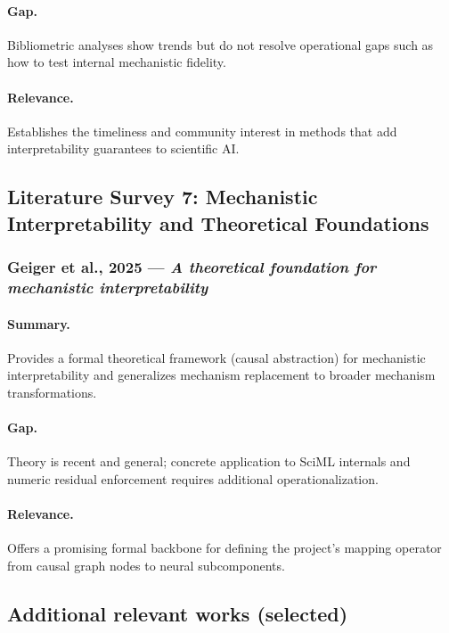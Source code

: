 \documentclass[12pt,singleside,a4paper]{article}
\begin{document}
\paragraph{Gap.}
Bibliometric analyses show trends but do not resolve operational gaps such as how to test internal mechanistic fidelity.  
\paragraph{Relevance.}
Establishes the timeliness and community interest in methods that add interpretability guarantees to scientific AI. 

\subsection{Literature Survey 7: Mechanistic Interpretability and Theoretical Foundations}

\subsubsection{Geiger et al., 2025 — \textit{A theoretical foundation for mechanistic interpretability}}
\paragraph{Summary.}
Provides a formal theoretical framework (causal abstraction) for mechanistic interpretability and generalizes mechanism replacement to broader mechanism transformations.  
\paragraph{Gap.}
Theory is recent and general; concrete application to SciML internals and numeric residual enforcement requires additional operationalization.  
\paragraph{Relevance.}
Offers a promising formal backbone for defining the project’s mapping operator from causal graph nodes to neural subcomponents. 

\subsection{Additional relevant works (selected)}
\end{document}
